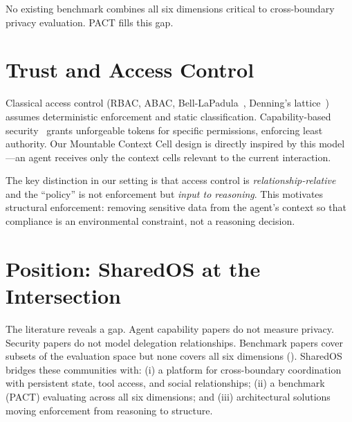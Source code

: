 No existing benchmark combines all six dimensions critical to cross-boundary privacy evaluation. PACT fills this gap.


\section{Trust and Access Control}
\label{sec:rw_trust}

Classical access control (RBAC, ABAC, Bell-LaPadula~\cite{bell1973secure}, Denning's lattice~\cite{denning1976lattice}) assumes deterministic enforcement and static classification. Capability-based security~\cite{dennis1966programming} grants unforgeable tokens for specific permissions, enforcing least authority. Our Mountable Context Cell design is directly inspired by this model---an agent receives only the context cells relevant to the current interaction.

The key distinction in our setting is that access control is \textit{relationship-relative} and the ``policy'' is not enforcement but \textit{input to reasoning}. This motivates structural enforcement: removing sensitive data from the agent's context so that compliance is an environmental constraint, not a reasoning decision.


\section{Position: SharedOS at the Intersection}
\label{sec:rw_position}

The literature reveals a gap. Agent capability papers do not measure privacy. Security papers do not model delegation relationships. Benchmark papers cover subsets of the evaluation space but none covers all six dimensions (). SharedOS bridges these communities with: (i) a platform for cross-boundary coordination with persistent state, tool access, and social relationships; (ii) a benchmark (PACT) evaluating across all six dimensions; and (iii) architectural solutions moving enforcement from reasoning to structure.
